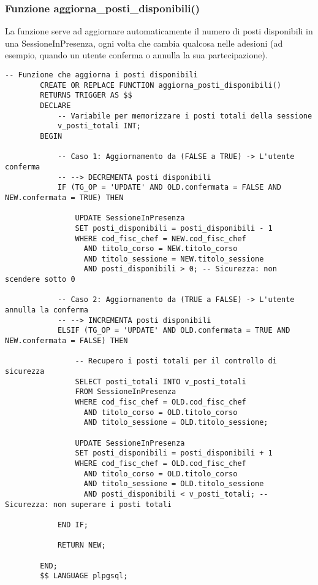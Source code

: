 \documentclass[a4paper, 12pt]{article}
\begin{document}
    \subsubsection{Funzione aggiorna\_posti\_disponibili()}
        La funzione serve ad aggiornare automaticamente il numero di posti disponibili in una SessioneInPresenza, ogni volta che cambia qualcosa nelle adesioni (ad esempio, quando un utente conferma o annulla la sua partecipazione).
        \begin{lstlisting}[style=sqlstyle]
        -- Funzione che aggiorna i posti disponibili
        CREATE OR REPLACE FUNCTION aggiorna_posti_disponibili()
        RETURNS TRIGGER AS $$
        DECLARE
            -- Variabile per memorizzare i posti totali della sessione
            v_posti_totali INT;
        BEGIN
        
            -- Caso 1: Aggiornamento da (FALSE a TRUE) -> L'utente conferma
            -- --> DECREMENTA posti disponibili
            IF (TG_OP = 'UPDATE' AND OLD.confermata = FALSE AND NEW.confermata = TRUE) THEN
                
                UPDATE SessioneInPresenza
                SET posti_disponibili = posti_disponibili - 1
                WHERE cod_fisc_chef = NEW.cod_fisc_chef
                  AND titolo_corso = NEW.titolo_corso
                  AND titolo_sessione = NEW.titolo_sessione
                  AND posti_disponibili > 0; -- Sicurezza: non scendere sotto 0
        
            -- Caso 2: Aggiornamento da (TRUE a FALSE) -> L'utente annulla la conferma
            -- --> INCREMENTA posti disponibili
            ELSIF (TG_OP = 'UPDATE' AND OLD.confermata = TRUE AND NEW.confermata = FALSE) THEN
                
                -- Recupero i posti totali per il controllo di sicurezza
                SELECT posti_totali INTO v_posti_totali
                FROM SessioneInPresenza
                WHERE cod_fisc_chef = OLD.cod_fisc_chef
                  AND titolo_corso = OLD.titolo_corso
                  AND titolo_sessione = OLD.titolo_sessione;
                
                UPDATE SessioneInPresenza
                SET posti_disponibili = posti_disponibili + 1
                WHERE cod_fisc_chef = OLD.cod_fisc_chef
                  AND titolo_corso = OLD.titolo_corso
                  AND titolo_sessione = OLD.titolo_sessione
                  AND posti_disponibili < v_posti_totali; -- Sicurezza: non superare i posti totali
                      
            END IF;
            
            RETURN NEW;
            
        END;
        $$ LANGUAGE plpgsql;
        \end{lstlisting}
\end{document}
